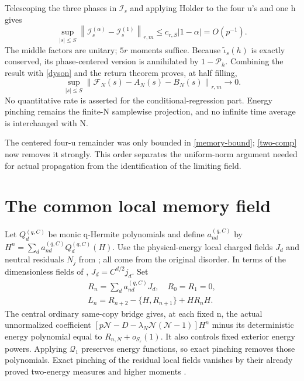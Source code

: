 \documentclass[11pt]{article}
\newcommand{\Nc}{\mathcal N}
\newcommand{\Pin}{\mathcal P_h}
\newcommand{\norm}[1]{\left\lVert#1\right\rVert}
\newcommand{\Qop}{\mathscr Q}
\begin{document}
Telescoping the three phases in $\mathcal I_s$ and applying
Holder to the four u's and one h gives
\begin{equation}\label{alpha-I}
 \sup_{|s|\le S}\norm{\mathcal I_s^{(\alpha)}-
                     \mathcal I_s^{(1)}}_{r,m}
 \le c_{r,S}|1-\alpha|=O(p^{-1}).
\end{equation}
The middle factors are unitary; $5r$ moments suffice. Because
$\widetilde\iota_s(h)$ is exactly conserved, its phase-centered
version is annihilated by $1-\Pin$. Combining the result with
\eqref{dyson} and the return theorem proves, at half filling,
\begin{equation}\label{two-comp}
 \sup_{|s|\le S}\norm{\mathcal F_N(s)-A_N(s)-B_N(s)}_{r,m}\to0.
\end{equation}
No quantitative rate is asserted for the conditional-regression
part. Energy pinching remains the finite-N samplewise projection,
and no infinite time average is interchanged with N.

The centered four-u remainder was only bounded in
\eqref{memory-bound}; \eqref{two-comp} now removes it strongly.
This order separates the uniform-norm argument needed for actual
propagation from the identification of the limiting field.

\newpage
\section{The common local memory field}\label{limit}
Let $Q_d^{(q,C)}$ be monic q-Hermite polynomials and define
$a_{nd}^{(q,C)}$ by $H^n=\sum_d a_{nd}^{(q,C)}Q_d^{(q,C)}(H)$.
Use the physical-energy local charged fields $J_d$ and neutral
residuals $N_j$ from \cite{central,neutral,higher}; all come from
the original disorder. In terms of the dimensionless fields
of \cite{central}, $J_d=C^{d/2}j_d$. Set
\begin{gather}
 R_n=\sum_d a_{nd}^{(q,C)}J_d,\quad R_0=R_1=0,\nonumber\\
 L_n=R_{n+2}-\{H,R_{n+1}\}+HR_nH.\label{Ln}
\end{gather}
The central ordinary same-copy bridge gives, at each fixed n,
the actual unnormalized coefficient
$[p\Nc-D-\lambda_N\Nc(\Nc-1)]H^n$ minus its deterministic
energy polynomial equal to $R_{n,N}+o_{S_r}(1)$.
It also controls fixed exterior energy powers. Applying
$\Qop_1$ preserves energy functions, so exact pinching removes
those polynomials. Exact pinching of the residual local fields
vanishes by their already proved two-energy measures and higher
moments \cite{central,higher,neutral}.
\end{document}
